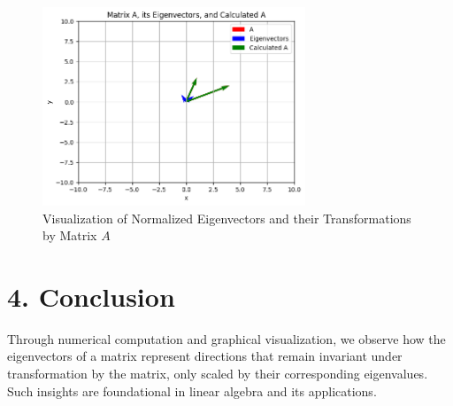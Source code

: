 \documentclass{article}
\begin{document}
\begin{figure}[h!]
    \centering
    \includegraphics[width=0.7\textwidth]{output.png}
    \caption{Visualization of Normalized Eigenvectors and their Transformations by Matrix $A$}
    \label{fig:eigenvectors}
\end{figure}

\section*{4. Conclusion}
Through numerical computation and graphical visualization, we observe how the eigenvectors of a matrix represent directions that remain invariant under transformation by the matrix, only scaled by their corresponding eigenvalues. Such insights are foundational in linear algebra and its applications.
\end{document}
